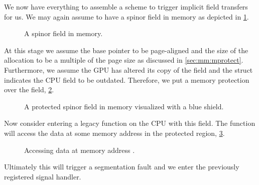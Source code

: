 We now have everything to assemble a scheme to trigger implicit field transfers for us.
We may again assume to have a spinor field in memory as depicted in \cref{fig:mm:field3:no_mprotect}.
\begin{figure}
  
  \caption{A spinor field in memory.}
  \label{fig:mm:field3:no_mprotect}
\end{figure}
At this stage we assume the base pointer to be page-aligned and the size of the allocation to be a multiple of the page size as discussed in \cref{sec:mm:mprotect}.
Furthermore, we assume the GPU has altered its copy of the field and the  struct indicates the CPU field to be outdated.
Therefore, we put a memory protection over the field, \cref{fig:mm:field4:mprotected}.
\begin{figure}
  
  \caption{A protected spinor field in memory visualized with a blue shield.}
  \label{fig:mm:field4:mprotected}
\end{figure}
Now consider entering a legacy function on the CPU with this field.
The function will access the data at some memory address in the protected region, \cref{fig:mm:field5:access}.
\begin{figure}
  
  \caption{Accessing data at memory address .}
  \label{fig:mm:field5:access}
\end{figure}
Ultimately this will trigger a segmentation fault and we enter the previously registered signal handler.

